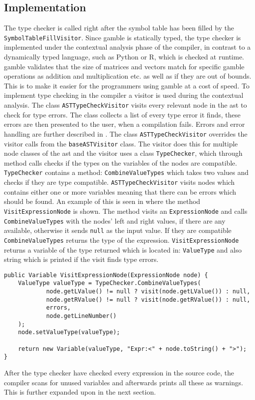 \subsection*{Implementation}
The type checker is called right after the symbol table has been filled by the \texttt{SymbolTableFillVisitor}.
Since \gls{gamble} is statically typed, the type checker is implemented under the contextual analysis phase of the compiler, in contrast to a dynamically typed language, such as Python or R, which is checked at runtime. 
\gls{gamble} validates that the size of matrices and vectors match for specific \gls{gamble} operations as addition and multiplication etc. as well as if they are out of bounds. 
This is to make it easier for the programmers using \gls{gamble} at a cost of speed. 
To implement type checking in the compiler a visitor is used during the contextual analysis.
The class \texttt{ASTTypeCheckVisitor} visits every relevant node in the \acrshort{ast} to check for type errors.
The class collects a list of every type error it finds, these errors are then presented to the user, when a compilation fails.
Errors and error handling are further described in .
The class \texttt{ASTTypeCheckVisitor} overrides the visitor calls from the \texttt{baseASTVisitor} class.
The visitor does this for multiple node classes of the \acrshort{ast} and the visitor uses a class \texttt{TypeChecker}, which through method calls checks if the types on the variables of the nodes are compatible.
\texttt{TypeChecker} contains a method: \texttt{CombineValueTypes} which takes two values and checks if they are type compatible.
\texttt{ASTTypeCheckVisitor} visits nodes which contains either one or more variables meaning that there can be errors which should be found. 
An example of this is seen in  where the method \texttt{VisitExpressionNode} is shown.
The method visits an \texttt{ExpressionNode} and calls \texttt{CombineValueTypes} with the nodes' left and right values, if there are any available, otherwise it sends \texttt{null} as the input value.
If they are compatible \texttt{CombineValueTypes} returns the type of the expression.
\texttt{VisitExpressionNode} returns a variable of the type returned which is located in: \texttt{ValueType} and also string which is printed if the visit finds type errors.

\begin{lstlisting}[caption=The VisitExprressionNode method in the ASTTypeChecker class,numbers=none,frame=tlrb,label={lst:typecheck1}]
public Variable VisitExpressionNode(ExpressionNode node) {
    ValueType valueType = TypeChecker.CombineValueTypes(
            node.getLValue() != null ? visit(node.getLValue()) : null,
            node.getRValue() != null ? visit(node.getRValue()) : null,
            errors,
            node.getLineNumber()
    );
    node.setValueType(valueType);

    return new Variable(valueType, "Expr:<" + node.toString() + ">");
}
\end{lstlisting}

After the type checker have checked every expression in the source code, the compiler scans for unused variables and afterwards prints all these as warnings.
This is further expanded upon in the next section.
